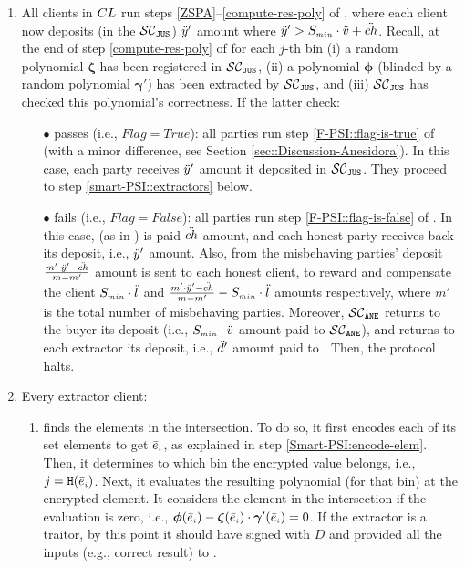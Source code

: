 \begin{enumerate}[leftmargin=5mm]
\item\label{e-psi::invoke-remainer-F-PSI} All clients in ${CL}$   run steps \ref{ZSPA}--\ref{compute-res-poly} of \fpsi, where each client now deposits (in the $\mathcal{SC}_{\mathtt{JUS}}$) $\ddot{y}'$ amount where $\ddot{y}'>S_{\scriptscriptstyle min}\cdot \ddot{v}+{\ddot{ch}}$. Recall, at the end of step \ref{compute-res-poly}  of \fpsi for each $j$-th bin (i) a random polynomial $\bm\zeta$ has been registered in $\mathcal{SC}_{\mathtt{JUS}}$, (ii) a polynomial $\bm\phi$ (blinded by a random polynomial $\bm\gamma'$) has been extracted by $\mathcal{SC}_{\mathtt{JUS}}$, and (iii) $\mathcal{SC}_{\mathtt{JUS}}$  has checked this polynomial's  correctness. If the latter check:

\begin{itemize}[leftmargin=2mm]
\item[$\bullet$] passes (i.e., $Flag=True$): all parties run step \ref{F-PSI::flag-is-true} of \fpsi (with a minor difference, see Section \ref{sec::Discussion-Anesidora}).  In this case, each party receives $\ddot{y}'$ amount it deposited in $\mathcal{SC}_{\mathtt{JUS}}$. They proceed to step \ref{smart-PSI::extractors} below.
\item[$\bullet$]  fails (i.e., $Flag=False$): all parties run step \ref{F-PSI::flag-is-false}  of \fpsi. In this case,
(as in \fpsi) \aud is paid $\ddot{ch}$ amount, and each honest party receives back its deposit, i.e., $\ddot{y}'$ amount. Also,  from the misbehaving parties' deposit  $\frac{m'\cdot \ddot{y}'-\ddot{ch}}{m-m'}$ amount is sent to each honest client,  to reward and compensate the client $S_{\scriptscriptstyle min}\cdot \ddot{l}$ and $\frac{m'\cdot \ddot{y}'-\ddot{ch}}{m-m'}- S_{\scriptscriptstyle min}\cdot \ddot{l}$ amounts respectively, where $m'$ is the total number of misbehaving parties.  Moreover, $\mathcal{SC}_{\mathtt{ANE}}$ returns to the buyer its deposit (i.e., $S_{\scriptscriptstyle min}\cdot \ddot{v}$ amount paid to $\mathcal{SC}_{\mathtt{ANE}}$), and returns to each extractor its deposit, i.e., $\ddot{d}'$ amount paid to \SCpc. Then, the protocol halts. 
\end{itemize}

\item\label{smart-PSI::extractors} Every extractor client: 
\begin{enumerate}[leftmargin=2.5mm]

\item finds the elements in the intersection. To do so, it first encodes each of its set elements to get $\bar e_{\scriptscriptstyle i}$, as explained in step \ref{Smart-PSI:encode-elem}.  
%
 Then, it determines to which bin the encrypted value belongs, i.e., ${ {  {j}}}=\mathtt{H}( \bar{e}_{\scriptscriptstyle i})$. Next, it evaluates the resulting polynomial (for that bin) at the encrypted element. It considers the element in the intersection if the evaluation is zero, i.e., $\bm\phi( \bar{e}_{\scriptscriptstyle i})-\bm\zeta( \bar{e}_{\scriptscriptstyle i})\cdot \bm\gamma'( \bar{e}_{\scriptscriptstyle i})=0$. If the extractor is a traitor, by this point it should have signed \SCtc with $ { D}$ and provided all the inputs (e.g., correct result) to \SCtc. 


\end{enumerate}
\end{enumerate}
